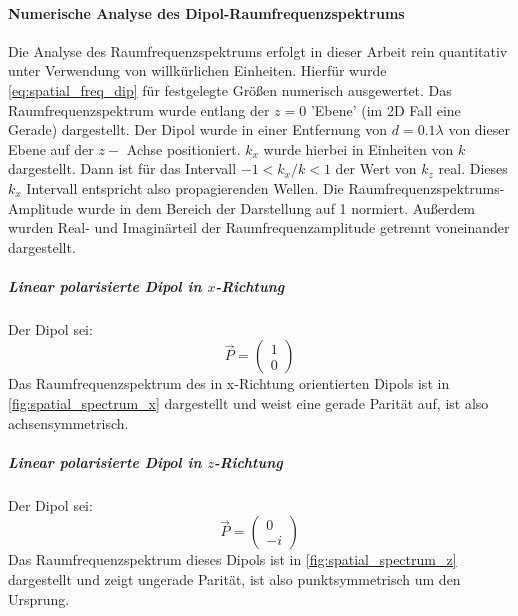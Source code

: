 \documentclass[titlepage]{article}
\begin{document}
	\paragraph{Numerische Analyse des Dipol-Raumfrequenzspektrums}
		Die Analyse des Raumfrequenzspektrums erfolgt in dieser Arbeit rein quantitativ unter Verwendung von willkürlichen Einheiten. Hierfür wurde \eqref{eq:spatial_freq_dip} für festgelegte Größen numerisch ausgewertet.
		Das Raumfrequenzspektrum wurde entlang der $z = 0$ 'Ebene' (im 2D Fall eine Gerade) dargestellt. Der Dipol wurde in einer Entfernung von $d = 0.1 \lambda$  von dieser Ebene auf der $z-$ Achse positioniert. $k_x$ wurde hierbei in Einheiten von $k$ dargestellt. Dann ist für das Intervall $-1 < k_x / k <1$ der Wert von $k_z$ real. Dieses $k_x$ Intervall entspricht also propagierenden Wellen. Die Raumfrequenzspektrums-Amplitude wurde in dem Bereich der Darstellung auf 1 normiert. Außerdem wurden Real- und Imaginärteil der Raumfrequenzamplitude getrennt voneinander dargestellt.
		\subparagraph{Linear polarisierte Dipol in $x$-Richtung}
			Der Dipol sei:
			 $$\vec{P} = \begin{pmatrix} 1 \\ 0\end{pmatrix}$$
			Das Raumfrequenzspektrum des in x-Richtung orientierten Dipols ist in \ref{fig:spatial_spectrum_x} dargestellt und weist eine gerade Parität auf, ist also achsensymmetrisch.	
		\subparagraph{Linear polarisierte Dipol in $z$-Richtung}
			Der Dipol sei:
			$$\vec{P} = \begin{pmatrix} 0 \\ -i\end{pmatrix}$$
			Das Raumfrequenzspektrum dieses Dipols ist in \ref{fig:spatial_spectrum_z} dargestellt und zeigt ungerade Parität, ist also punktsymmetrisch um den Ursprung.
\end{document}
